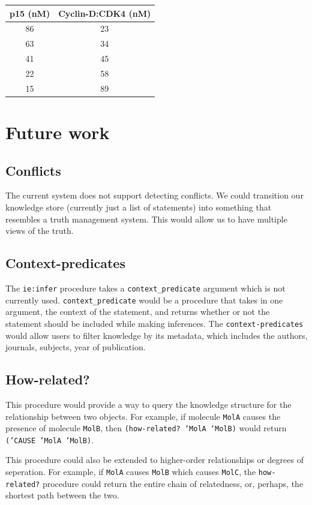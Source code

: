 \documentclass[11pt]{article}
\begin{document}
\begin{center}
\begin{tabular}{cc}
p15 (nM) & Cyclin-D:CDK4 (nM)\\
\hline
86 & 23\\
63 & 34\\
41 & 45\\
22 & 58\\
15 & 89\\
\end{tabular}
\end{center}
\section{Future work}
\label{sec-4}


\subsection{Conflicts}
\label{sec-4-1}
The current system does not support detecting conflicts. We could transition our knowledge store (currently just a list of statements) into something that resembles a truth management system. This would allow us to have multiple views of the truth.
\subsection{Context-predicates}
\label{sec-4-2}
The \texttt{ie:infer} procedure takes a \texttt{context\_predicate} argument which is not currently used. \texttt{context\_predicate} would be a procedure that takes in one argument, the context of the statement, and returns whether or not the statement should be included while making inferences. The \texttt{context-predicates} would allow users to filter knowledge by its metadata, which includes the authors, journals, subjects, year of publication.
\subsection{How-related?}
\label{sec-4-3}
This procedure would provide a way to query the knowledge structure for the relationship between two objects. For example, if molecule \texttt{MolA} causes the presence of molecule \texttt{MolB}, then \texttt{(how-related? ‘MolA ‘MolB)} would return \texttt{('CAUSE 'MolA 'MolB)}.

This procedure could also be extended to higher-order relationships or degrees of seperation. For example, if \texttt{MolA} causes \texttt{MolB} which causes \texttt{MolC}, the \texttt{how-related?} procedure could return the entire chain of relatedness, or, perhaps, the shortest path between the two.
\end{document}
